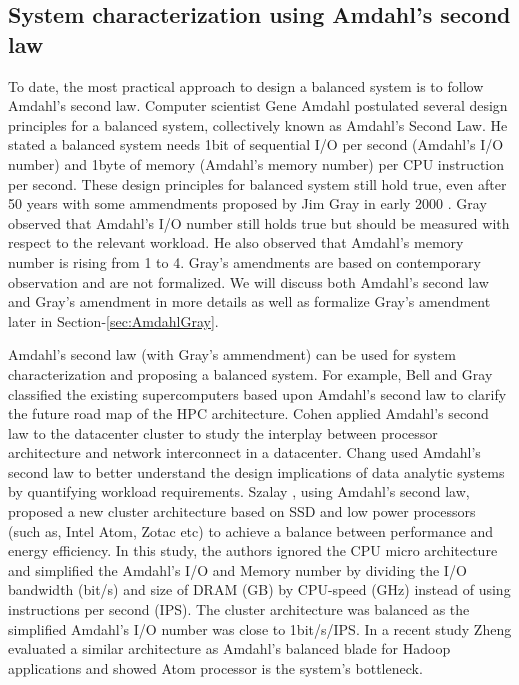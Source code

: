 \documentclass[journal]{IEEEtran}
\begin{document}
\subsection{System characterization using Amdahl's second law }
To date, the most practical approach to design a balanced system is to follow Amdahl's second law.  Computer scientist Gene Amdahl  postulated several design principles for a balanced system, collectively known as Amdahl's Second Law.  He stated a balanced system needs 1bit of sequential I/O per second (Amdahl's I/O number) and 1byte of memory (Amdahl's memory number) per CPU instruction per second. These design principles for balanced system still hold true, even after 50 years with some ammendments proposed by Jim Gray in early 2000 \cite{Amdahl:RuleofThumbgray2000rules}. Gray observed that Amdahl's I/O number still holds true but should be measured with respect to the relevant workload. He also observed that  Amdahl's memory number is rising from 1 to 4. Gray's amendments are based on contemporary observation and are not formalized. We will discuss both Amdahl's second law and Gray's amendment in more details as well as formalize Gray's amendment later in Section-\ref{sec:AmdahlGray}. 

Amdahl's second law (with Gray's ammendment) can be used for system characterization and proposing a balanced system. For example, Bell and Gray \cite{Amdahl:PetascaleBell2005petascale} classified the existing supercomputers based upon Amdahl's second law to clarify the future road map of the HPC architecture. Cohen \cite{Balance:cohen2009applying} applied Amdahl's second law to the datacenter cluster to study the interplay between processor architecture and network interconnect in a datacenter. Chang  \cite{Amdahl:Workloadchang} used Amdahl's second law to better understand the design implications of data analytic systems by quantifying workload requirements. Szalay \cite{cluster:AmdahlBalancedBlade}, using Amdahl's second law, proposed a new cluster architecture  based on SSD and low power processors (such as, Intel Atom, Zotac etc) to achieve a balance between performance and energy efficiency. In this study, the authors ignored the CPU micro architecture and simplified the Amdahl's I/O and Memory number by dividing the I/O bandwidth (bit/s) and size of DRAM (GB) by CPU-speed (GHz) instead of using instructions per second (IPS). The cluster architecture was balanced as the simplified Amdahl's I/O number was close to 1bit/s/IPS. In a recent study \cite{Balance:zheng2014hadoop} Zheng evaluated a similar architecture as Amdahl's balanced blade for Hadoop applications and showed Atom processor is the system's bottleneck.  %
\end{document}
